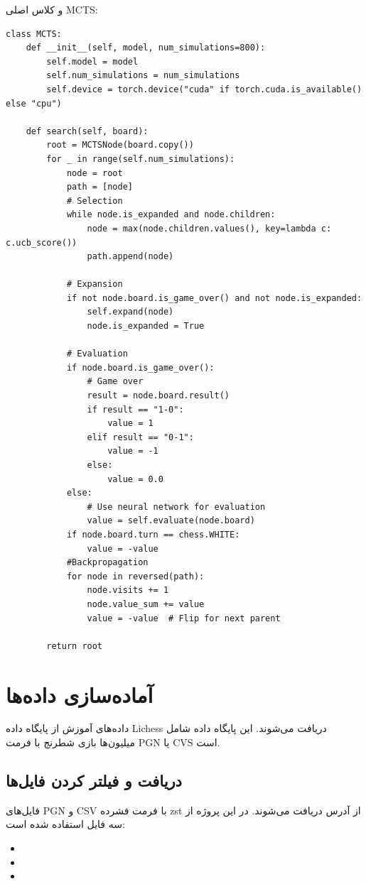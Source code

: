 \documentclass[12pt,a4paper]{article}
\begin{document}
	و کلاس اصلی MCTS:
	\\
	\begin{latin}
\begin{verbatim}
class MCTS:
    def __init__(self, model, num_simulations=800):
        self.model = model
        self.num_simulations = num_simulations
        self.device = torch.device("cuda" if torch.cuda.is_available() else "cpu")
        
    def search(self, board):
        root = MCTSNode(board.copy())
        for _ in range(self.num_simulations):
            node = root
            path = [node]
            # Selection
            while node.is_expanded and node.children:
                node = max(node.children.values(), key=lambda c: c.ucb_score())
                path.append(node)
            
            # Expansion
            if not node.board.is_game_over() and not node.is_expanded:
                self.expand(node)
                node.is_expanded = True
            
            # Evaluation
            if node.board.is_game_over():
                # Game over
                result = node.board.result()
                if result == "1-0":
                    value = 1
                elif result == "0-1":
                    value = -1
                else:
                    value = 0.0
            else:
                # Use neural network for evaluation
                value = self.evaluate(node.board)
            if node.board.turn == chess.WHITE:
                value = -value
            #Backpropagation
            for node in reversed(path):
                node.visits += 1
                node.value_sum += value
                value = -value  # Flip for next parent
                
        return root
\end{verbatim}
	\end{latin}
	
	\section{آماده‌سازی داده‌ها}
	داده‌های آموزش از پایگاه داده Lichess دریافت می‌شوند. این پایگاه داده شامل میلیون‌ها بازی شطرنج با فرمت PGN یا CVS است.
	
	\subsection{دریافت و فیلتر کردن فایل‌ها}
	فایل‌های PGN و CSV با فرمت فشرده zst از آدرس  دریافت می‌شوند. در این پروژه از سه فایل استفاده شده است:
	\begin{itemize}
		\item {} 
		\item {} 
        \item {}
	\end{itemize}
	
\end{document}
